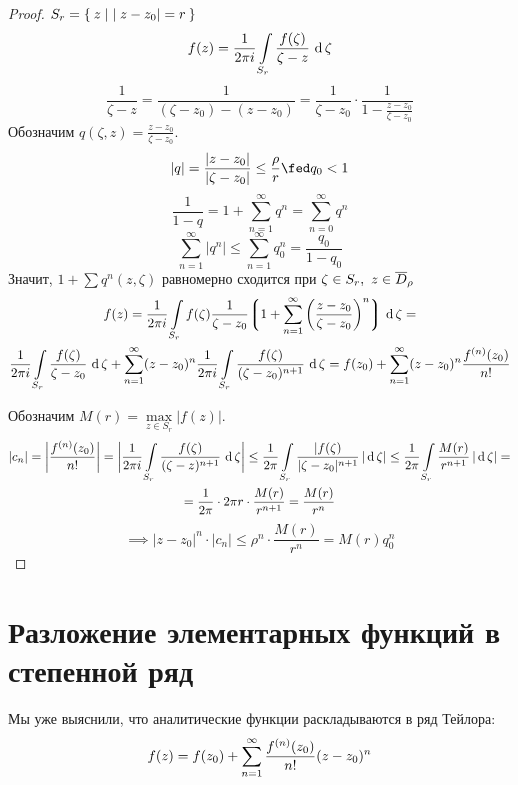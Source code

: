 \begin{proof}
	$ S_r = \set{z \mid |z - z_0| = r} $
	$$ f(z) = \frac1{2\pi i} \cint[\zeta]{S_r}{\frac{f(\zeta)}{\zeta - z}} $$
	$$ \frac1{\zeta - z} = \frac1{(\zeta - z_0) - (z - z_0)} = \frac1{\zeta - z_0} \cdot \frac1{1 - \frac{z - z_0}{\zeta - z_0}} $$
	Обозначим $ q(\zeta, z) = \frac{z - z_0}{\zeta - z_0} $.
	$$ |q| = \frac{|z - z_0|}{|\zeta - z_0|} \le \frac\rho r \fed q_0 < 1 $$
	$$ \frac1{1 - q} = 1 + \sum_{n = 1}^\infty q^n = \sum_{n = 0}^\infty q^n $$
	$$ \sum_{n = 1}^\infty |q^n| \le \sum_{n = 1}^\infty q_0^n = \frac{q_0}{1 - q_0} $$
	Значит, $ 1 + \sum q^n(z, \zeta) $ равномерно сходится при $ \zeta \in S_r, ~ z \in \ol D_\rho $
	\begin{multline*}
		f(z) = \frac1{2\pi i} \cint[\zeta]{S_r}{f(\zeta) \frac1{\zeta - z_0} \bigg\lgroup 1 + \sum_{n = 1}^\infty \bigg( \frac{z - z_0}{\zeta - z_0} \bigg)^n \bigg\rgroup} = \\
		\frac1{2\pi i} \cint[\zeta]{S_r}{\frac{f(\zeta)}{\zeta - z_0}} + \sum_{n = 1}^\infty (z - z_0)^n \frac1{2\pi i} \cint[\zeta]{S_r}{\frac{f(\zeta)}{(\zeta - z_0)^{n + 1}}} = f(z_0) + \sum_{n = 1}^\infty (z - z_0)^n \frac{\nder f(z_0)}{n!}
	\end{multline*}

	Обозначим $ M(r) = \max\limits_{z \in S_r}|f(z)| $.
	\begin{multline*}
		|c_n| = \bigg| \frac{\nder f(z_0)}{n!} \bigg| = \bigg| \frac1{2\pi i} \cint[\zeta]{S_r}{\frac{f(\zeta)}{(\zeta - z)^{n + 1}}} \bigg| \le \frac1{2\pi} \acint[\zeta]{S_r}{\frac{|f(\zeta)}{|\zeta - z_0|^{n + 1}}} \le \frac1{2\pi} \acint[\zeta]{S_r}{\frac{M(r)}{r^{n + 1}}} = \\
		= \frac1{2\pi} \cdot 2 \pi r \cdot \frac{M(r)}{r^{n + 1}} = \frac{M(r)}{r^n}
	\end{multline*}
	$$ \implies |z - z_0|^n \cdot |c_n| \le \rho^n \cdot \frac{M(r)}{r^n} = M(r) q_0^n $$
\end{proof}

\section{Разложение элементарных функций в степенной ряд}

Мы уже выяснили, что аналитические функции раскладываются в ряд Тейлора:
$$ f(z) = f(z_0) + \sum_{n = 1}^\infty \frac{\nder f(z_0)}{n!}(z - z_0)^n $$

